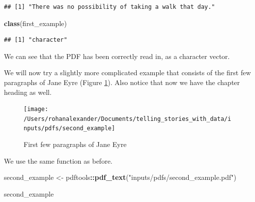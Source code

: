 \documentclass[
]{book}
\newenvironment{Shaded}{\begin{snugshade}}{\end{snugshade}}
\newcommand{\KeywordTok}[1]{\textcolor[rgb]{0.13,0.29,0.53}{\textbf{#1}}}
\newcommand{\NormalTok}[1]{#1}
\newcommand{\OperatorTok}[1]{\textcolor[rgb]{0.81,0.36,0.00}{\textbf{#1}}}
\newcommand{\StringTok}[1]{\textcolor[rgb]{0.31,0.60,0.02}{#1}}
\begin{document}
\begin{verbatim}
## [1] "There was no possibility of taking a walk that day."
\end{verbatim}

\begin{Shaded}
\begin{Highlighting}[]
\KeywordTok{class}\NormalTok{(first_example)}
\end{Highlighting}
\end{Shaded}

\begin{verbatim}
## [1] "character"
\end{verbatim}

We can see that the PDF has been correctly read in, as a character vector.

We will now try a slightly more complicated example that consists of the first few paragraphs of Jane Eyre (Figure \ref{fig:secondpdfexample}). Also notice that now we have the chapter heading as well.

\begin{figure}
\texttt{[image: /Users/rohanalexander/Documents/telling\_stories\_with\_data/inputs/pdfs/second\_example]} \caption{First few paragraphs of Jane Eyre}\label{fig:secondpdfexample}
\end{figure}

We use the same function as before.

\begin{Shaded}
\begin{Highlighting}[]
\NormalTok{second_example <-}\StringTok{ }\NormalTok{pdftools}\OperatorTok{::}\KeywordTok{pdf_text}\NormalTok{(}\StringTok{"inputs/pdfs/second_example.pdf"}\NormalTok{)}

\NormalTok{second_example}
\end{Highlighting}
\end{Shaded}
\end{document}
